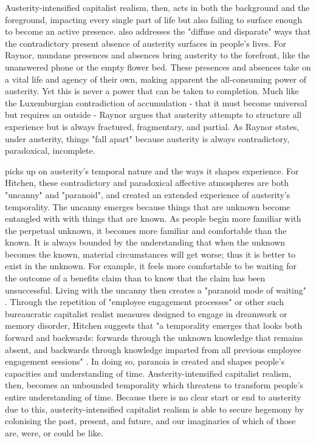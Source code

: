 Austerity-intensified capitalist realism, then, acts in both the background and the foreground, impacting every single part of life but also failing to surface enough to become an active presence. \citet[195]{raynor_dramatising_2017} also addresses the "diffuse and disparate" ways that the contradictory present absence of austerity surfaces in people's lives. For Raynor, mundane presences and absences bring austerity to the forefront, like the unanswered phone or the empty flower bed. These presences and absences take on a vital life and agency of their own, making apparent the all-consuming power of austerity. Yet this is never a power that can be taken to completion. Much like the Luxemburgian contradiction of accumulation - that it must become universal but requires an outside - Raynor argues that austerity attempts to structure all experience but is always fractured, fragmentary, and partial. As Raynor states, under austerity, things "fall apart" because austerity is always contradictory, paradoxical, incomplete.

\citet{hitchen_affective_2019} picks up on austerity's temporal nature and the ways it shapes experience. For Hitchen, these contradictory and paradoxical affective atmospheres are both "uncanny" and "paranoid", and created an extended experience of austerity's temporality. The uncanny emerges because things that are unknown become entangled with with things that are known. As people begin more familiar with the perpetual unknown, it becomes more familiar and comfortable than the known. It is always bounded by the understanding that when the unknown becomes the known, material circumstances will get worse; thus it is better to exist in the unknown. For example, it feels more comfortable to be waiting for the outcome of a benefits claim than to know that the claim has been unsuccessful. Living with the uncanny then  creates a "paranoid mode of waiting" \citep[13]{hitchen_affective_2019}. Through the repetition of "employee engagement processes" or other such bureaucratic capitalist realist measures designed to engage in dreamwork or memory disorder, Hitchen suggests that "a temporality emerges that looks both forward and backwards: forwards through the unknown knowledge that remains absent, and backwards through knowledge imparted from all previous employee engagement sessions" \citep[12]{hitchen_affective_2019}. In doing so, paranoia is created and shapes people's capacities and understanding of time. Austerity-intensified capitalist realism, then, becomes an unbounded temporality which threatens to transform people's entire understanding of time. Because there is no clear start or end to austerity due to this, austerity-intensified capitalist realism is able to secure hegemony by colonising the past, present, and future, and our imaginaries of which of those are, were, or could be like.

